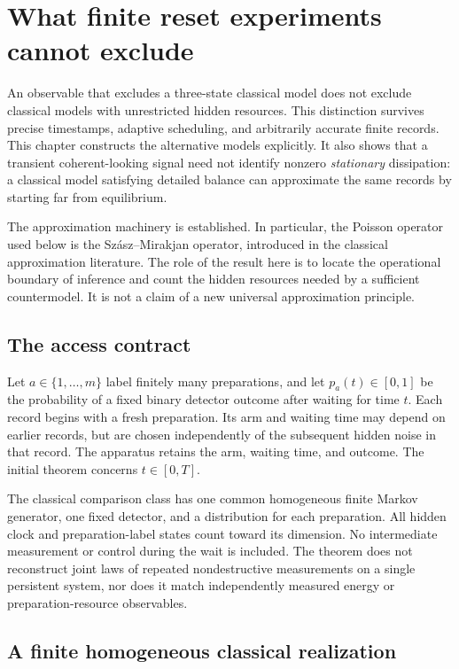 \chapter{What finite reset experiments cannot exclude}
\label{rf:limits}

An observable that excludes a three-state classical model does not exclude
classical models with unrestricted hidden resources. This distinction survives
precise timestamps, adaptive scheduling, and arbitrarily accurate finite
records. This chapter constructs the alternative models explicitly. It also
shows that a transient coherent-looking signal need not identify nonzero
\emph{stationary} dissipation: a classical model satisfying detailed balance
can approximate the same records by starting far from equilibrium.

The approximation machinery is established. In particular, the Poisson
operator used below is the Sz\'asz--Mirakjan operator, introduced in the
classical approximation literature\cite{rfSzasz1950}. The role of the result
here is to locate the operational boundary of inference and count the hidden
resources needed by a sufficient countermodel. It is not a claim of a new
universal approximation principle.

\section{The access contract}

Let $a\in\{1,\ldots,m\}$ label finitely many preparations, and let
$p_a(t)\in[0,1]$ be the probability of a fixed binary detector outcome after
waiting for time $t$. Each record begins with a fresh preparation. Its arm and
waiting time may depend on earlier records, but are chosen independently of
the subsequent hidden noise in that record. The apparatus retains the arm,
waiting time, and outcome. The initial theorem concerns $t\in[0,T]$.

The classical comparison class has one common homogeneous finite Markov
generator, one fixed detector, and a distribution for each preparation. All
hidden clock and preparation-label states count toward its dimension. No
intermediate measurement or control during the wait is included. The theorem
does not reconstruct joint laws of repeated nondestructive measurements on a
single persistent system, nor does it match independently measured energy or
preparation-resource observables.

\section{A finite homogeneous classical realization}

